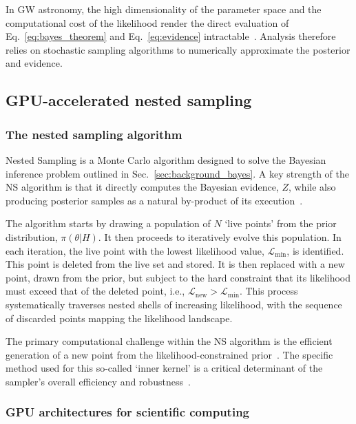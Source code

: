 \documentclass[fleqn,usenatbib]{mnras}
\begin{document}
In GW astronomy, the high dimensionality of the parameter space and
the computational cost of the likelihood render the direct evaluation
of Eq.~\ref{eq:bayes_theorem} and Eq.~\ref{eq:evidence} intractable~\citep{LIGO_guide_signalextraction}.
Analysis therefore relies on stochastic sampling algorithms to
numerically approximate the posterior and evidence.

\subsection{GPU-accelerated nested sampling}

\label{sec:background_ns_and_gpus}

\subsubsection{The nested sampling algorithm}
\label{sec:background_ns}

Nested Sampling is a Monte Carlo algorithm designed to solve the
Bayesian inference problem outlined in Sec.~\ref{sec:background_bayes}.
A key strength of the NS algorithm is that it directly computes the
Bayesian evidence, $Z$, while also producing posterior samples as a
natural by-product of its execution~\citep{skilling, dynamic_ns}.

The algorithm starts by drawing a population of $N$ `live points'
from the prior distribution, $\pi(\theta|H)$. It then proceeds
to iteratively evolve this population. In each iteration, the live point with the lowest
likelihood value, $\mathcal{L}_{\text{min}}$, is identified. This point
is deleted from the live set and stored. It is then replaced with a
new point, drawn from the prior, but subject to the hard constraint that
its likelihood must exceed that of the deleted point,
i.e., $\mathcal{L}_{\text{new}} > \mathcal{L}_{\text{min}}$. This process
systematically traverses nested shells of increasing likelihood, with
the sequence of discarded points mapping the likelihood landscape.

The primary computational challenge within the NS algorithm is the
efficient generation of a new point from the likelihood-constrained
prior~\citep{NSNature}. The specific method used for this so-called `inner kernel' is a
critical determinant of the sampler's overall efficiency and robustness~\citep{NS_methods_buchner}.

\subsubsection{GPU architectures for scientific computing}
\label{sec:background_gpus}
\end{document}

